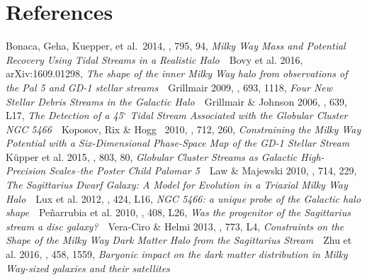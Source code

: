 \documentclass[12pt]{article}
\begin{document}
%
%
%
%

%

\section*{References}\vskip-0.2in
{\small
Bonaca, Geha, Kuepper, et al.\ 2014, \apj, 795, 94, \emph{Milky Way Mass and Potential Recovery Using Tidal Streams in a Realistic Halo} \,\textbullet\,
Bovy et al. 2016, arXiv:1609.01298, \emph{The shape of the inner Milky Way halo from observations of the Pal 5 and GD-1 stellar streams} \,\textbullet\,
Grillmair 2009, \apj, 693, 1118, \emph{Four New Stellar Debris Streams in the Galactic Halo} \,\textbullet\,
Grillmair \& Johnson 2006, \apj, 639, L17, \emph{The Detection of a 45$^\circ$ Tidal Stream Associated with the Globular Cluster NGC 5466} \,\textbullet\,
Koposov, Rix \& Hogg \ 2010, \apj, 712, 260, \emph{Constraining the Milky Way Potential with a Six-Dimensional Phase-Space Map of the GD-1 Stellar Stream} \,\textbullet\,
K\" upper et al. 2015, \apj, 803, 80, \emph{Globular Cluster Streams as Galactic High-Precision Scales--the Poster Child Palomar 5} \,\textbullet\,
Law \& Majewski 2010, \apj, 714, 229, \emph{The Sagittarius Dwarf Galaxy: A Model for Evolution in a Triaxial Milky Way Halo} \,\textbullet\,
Lux et al. 2012, \mnras, 424, L16, \emph{NGC 5466: a unique probe of the Galactic halo shape} \,\textbullet\,
Pe\~ narrubia et al. 2010, \mnras, 408, L26, \emph{Was the progenitor of the Sagittarius stream a disc galaxy?} \,\textbullet\,
Vera-Ciro \& Helmi 2013, \apj, 773, L4, \emph{Constraints on the Shape of the Milky Way Dark Matter Halo from the Sagittarius Stream} \,\textbullet\,
Zhu et al. 2016, \mnras, 458, 1559, \emph{Baryonic impact on the dark matter distribution in Milky Way-sized galaxies and their satellites}
}
\end{document}
